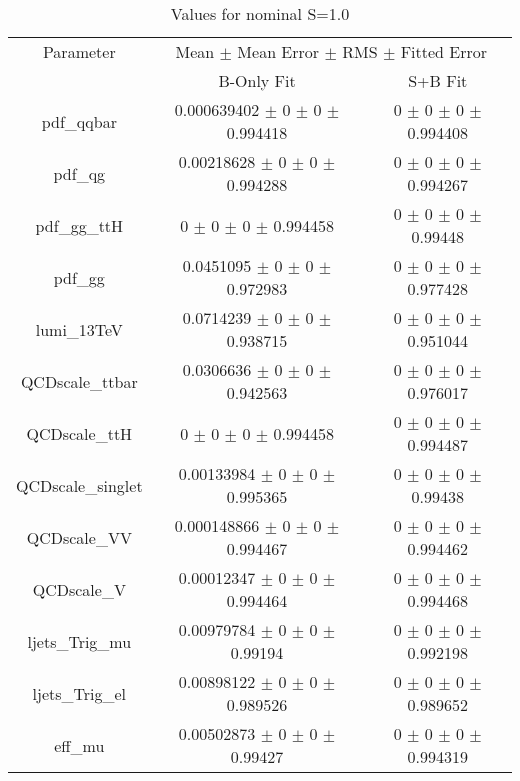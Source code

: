 \begin{table}
\centering
\caption{Values for nominal S=1.0}
\begin{tabular}{ccc}
\toprule
Parameter 	& \multicolumn{2}{c}{Mean $\pm$ Mean Error $\pm$ RMS $\pm$ Fitted Error}\\
 	& B-Only Fit & S+B Fit\\
\midrule
pdf\_qqbar 	& \num{0.000639402} $\pm$ \num{0} $\pm$ \num{0} $\pm$ \num{0.994418} 	& \num{0} $\pm$ \num{0} $\pm$ \num{0} $\pm$ \num{0.994408}\\
pdf\_qg 	& \num{0.00218628} $\pm$ \num{0} $\pm$ \num{0} $\pm$ \num{0.994288} 	& \num{0} $\pm$ \num{0} $\pm$ \num{0} $\pm$ \num{0.994267}\\
pdf\_gg\_ttH 	& \num{0} $\pm$ \num{0} $\pm$ \num{0} $\pm$ \num{0.994458} 	& \num{0} $\pm$ \num{0} $\pm$ \num{0} $\pm$ \num{0.99448}\\
pdf\_gg 	& \num{0.0451095} $\pm$ \num{0} $\pm$ \num{0} $\pm$ \num{0.972983} 	& \num{0} $\pm$ \num{0} $\pm$ \num{0} $\pm$ \num{0.977428}\\
lumi\_13TeV 	& \num{0.0714239} $\pm$ \num{0} $\pm$ \num{0} $\pm$ \num{0.938715} 	& \num{0} $\pm$ \num{0} $\pm$ \num{0} $\pm$ \num{0.951044}\\
QCDscale\_ttbar 	& \num{0.0306636} $\pm$ \num{0} $\pm$ \num{0} $\pm$ \num{0.942563} 	& \num{0} $\pm$ \num{0} $\pm$ \num{0} $\pm$ \num{0.976017}\\
QCDscale\_ttH 	& \num{0} $\pm$ \num{0} $\pm$ \num{0} $\pm$ \num{0.994458} 	& \num{0} $\pm$ \num{0} $\pm$ \num{0} $\pm$ \num{0.994487}\\
QCDscale\_singlet 	& \num{0.00133984} $\pm$ \num{0} $\pm$ \num{0} $\pm$ \num{0.995365} 	& \num{0} $\pm$ \num{0} $\pm$ \num{0} $\pm$ \num{0.99438}\\
QCDscale\_VV 	& \num{0.000148866} $\pm$ \num{0} $\pm$ \num{0} $\pm$ \num{0.994467} 	& \num{0} $\pm$ \num{0} $\pm$ \num{0} $\pm$ \num{0.994462}\\
QCDscale\_V 	& \num{0.00012347} $\pm$ \num{0} $\pm$ \num{0} $\pm$ \num{0.994464} 	& \num{0} $\pm$ \num{0} $\pm$ \num{0} $\pm$ \num{0.994468}\\
ljets\_Trig\_mu 	& \num{0.00979784} $\pm$ \num{0} $\pm$ \num{0} $\pm$ \num{0.99194} 	& \num{0} $\pm$ \num{0} $\pm$ \num{0} $\pm$ \num{0.992198}\\
ljets\_Trig\_el 	& \num{0.00898122} $\pm$ \num{0} $\pm$ \num{0} $\pm$ \num{0.989526} 	& \num{0} $\pm$ \num{0} $\pm$ \num{0} $\pm$ \num{0.989652}\\
eff\_mu 	& \num{0.00502873} $\pm$ \num{0} $\pm$ \num{0} $\pm$ \num{0.99427} 	& \num{0} $\pm$ \num{0} $\pm$ \num{0} $\pm$ \num{0.994319}\\

\end{tabular}
\end{table}
